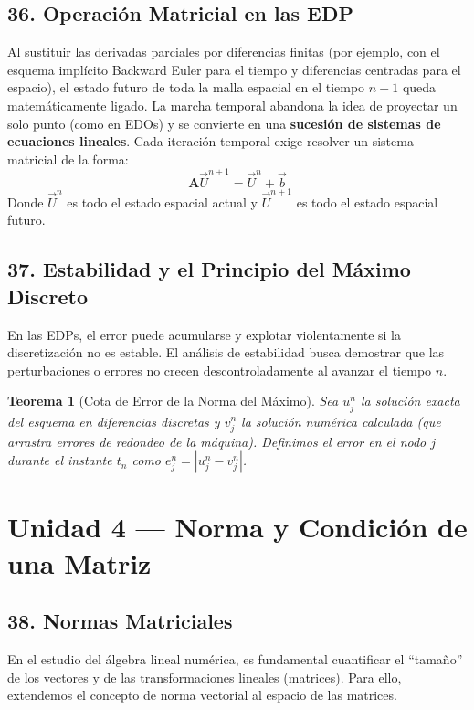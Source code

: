 \documentclass[12pt]{article}
\newtheorem{teorema}{Teorema}
\begin{document}
\subsection*{36. Operación Matricial en las EDP}
Al sustituir las derivadas parciales por diferencias finitas (por ejemplo, con el esquema implícito Backward Euler para el tiempo y diferencias centradas para el espacio), el estado futuro de toda la malla espacial en el tiempo $n+1$ queda matemáticamente ligado. 
La marcha temporal abandona la idea de proyectar un solo punto (como en EDOs) y se convierte en una \textbf{sucesión de sistemas de ecuaciones lineales}. Cada iteración temporal exige resolver un sistema matricial de la forma:
\begin{equation}
    \mathbf{A} \vec{U}^{n+1} = \vec{U}^n + \vec{b}
\end{equation}
Donde $\vec{U}^n$ es todo el estado espacial actual y $\vec{U}^{n+1}$ es todo el estado espacial futuro.

\subsection*{37. Estabilidad y el Principio del Máximo Discreto}
En las EDPs, el error puede acumularse y explotar violentamente si la discretización no es estable. El análisis de estabilidad busca demostrar que las perturbaciones o errores no crecen descontroladamente al avanzar el tiempo $n$.

\begin{teorema}[Cota de Error de la Norma del Máximo]
Sea $u_j^n$ la solución exacta del esquema en diferencias discretas y $v_j^n$ la solución numérica calculada (que arrastra errores de redondeo de la máquina). Definimos el error en el nodo $j$ durante el instante $t_n$ como $e_j^n = |u_j^n - v_j^n|$. 
\end{teorema}

\section*{Unidad 4 — Norma y Condición de una Matriz}

\subsection*{38. Normas Matriciales}

En el estudio del álgebra lineal numérica, es fundamental cuantificar el ``tamaño'' de los vectores y de las transformaciones lineales (matrices). Para ello, extendemos el concepto de norma vectorial al espacio de las matrices. 
\end{document}
